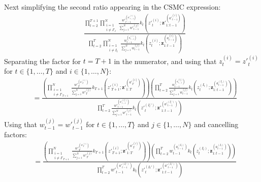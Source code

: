 \documentclass[11pt]{article}
\newcommand{\z}{\mathbf{z}}
\begin{document}
Next simplifying the second ratio appearing in the $\mathrm{CSMC}$ expression:
\begin{align*}
&\frac{
\prod_{t=2}^{T+1} \prod_{\substack{i=1\\i \ne I'_t}}^N \frac{{w'}_{t-1}^{({a'}_{t-1}^{(i)})}}{\sum_{j=1}^N {w'}_{t-1}^{(j)}} k_t({z'}_t^{(i)}; {\z'}_{1:t-1}^{({a'}_{t-1}^{(i)})} )
}{
\prod_{t=2}^T \prod_{\substack{i=1\\i \ne I_t}}^N \frac{w_{t-1}^{(a_{t-1}^{(i)})}}{\sum_{j=1}^N w_{t-1}^{(j)}} k_t(z_t^{(i)}; \z_{1:t-1}^{(a_{t-1}^{(i)})} )
}
\end{align*}
Separating the factor for $t = T+1$ in the numerator, and using that $z_t^{(i)} = {z'}_t^{(i)}$ for $t \in \{1, \ldots, T\}$ and $i \in \{1, \ldots, N\}$:
\begin{align*}
&= \frac{
\left(
\displaystyle \prod_{\substack{i=1\\i \ne I'_{T+1}}}^N \frac{{w'}_{T}^{({a'}_{T}^{(i)})}}{\sum_{j=1}^N {w'}_{T}^{(j)}} k_{T+1}({z'}_{T+1}^{(i)}; {\z'}_{1:T}^{({a'}_{T}^{(i)})} )
\right)
\left(
\displaystyle \prod_{t=2}^{T} \frac{{w}_{t-1}^{({a}_{t-1}^{(I_t)})}}{\sum_{j=1}^N {w}_{t-1}^{(j)}} k_t({z}_t^{(I_t)}; {\z}_{1:t-1}^{({a}_{t-1}^{(I_t)})} )
\right)
}{
\displaystyle \prod_{t=2}^{T} \frac{{w'}_{t-1}^{({a'}_{t-1}^{(I_t')})}}{\sum_{j=1}^N {w'}_{t-1}^{(j)}} k_t({z'}_t^{(I_t')}; {\z'}_{1:t-1}^{({a'}_{t-1}^{(I_t')})} )
}
\end{align*}
Using that $w_{t-1}^{(j)} ={w'}_{t-1}^{(j)}$ for $t \in \{1, \ldots, T\}$ and $j \in \{1, \ldots, N\}$ and cancelling factors:
\begin{align*}
&=
\frac{
\left(
\displaystyle \prod_{\substack{i=1\\i \ne I'_{T+1}}}^N \frac{{w'}_{T}^{({a'}_{T}^{(i)})}}{\sum_{j=1}^N {w'}_{T}^{(j)}} k_{T+1}({z'}_{T+1}^{(i)}; {\z'}_{1:T}^{({a'}_{T}^{(i)})} )
\right)
\left(
\displaystyle \prod_{t=2}^{T} {w}_{t-1}^{({a}_{t-1}^{(I_t)})} k_t({z}_t^{(I_t)}; {\z}_{1:t-1}^{({a}_{t-1}^{(I_t)})} )
\right)
}{
\displaystyle \prod_{t=2}^{T} {w'}_{t-1}^{({a'}_{t-1}^{(I_t')})} k_t({z'}_t^{(I_t')}; {\z'}_{1:t-1}^{({a'}_{t-1}^{(I_t')})} )
}
\end{align*}
\end{document}
